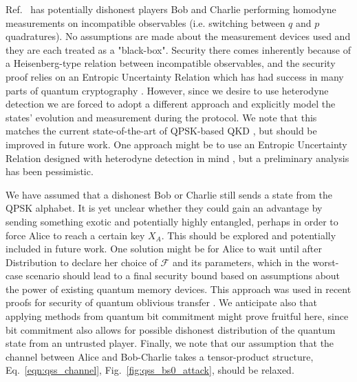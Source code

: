 Ref.~\cite{Kogias2017} has potentially dishonest players Bob and Charlie performing homodyne measurements on incompatible observables (i.e. switching between $q$ and $p$ quadratures). No assumptions are made about the measurement devices used and they are each treated as a "black-box". Security there comes inherently because of a Heisenberg-type relation between incompatible observables, and the security proof relies on an Entropic Uncertainty Relation which has had success in many parts of quantum cryptography \cite{Furrer2012, Furrer2017}. However, since we desire to use heterodyne detection we are forced to adopt a different approach and explicitly model the states' evolution and measurement during the protocol. We note that this matches the current state-of-the-art of QPSK-based QKD \cite{Papanastasiou2018}, but should be improved in future work. One approach might be to use an Entropic Uncertainty Relation designed with heterodyne detection in mind \cite{DePalma2017i, DePalma2017}, but a preliminary analysis has been pessimistic.

We have assumed that a dishonest Bob or Charlie still sends a state from the QPSK alphabet. It is yet unclear whether they could gain an advantage by sending something exotic and potentially highly entangled, perhaps in order to force Alice to reach a certain key $X_A$. This should be explored and potentially included in future work. One solution might be for Alice to wait until after Distribution to declare her choice of $\mathcal{F}$ and its parameters, which in the worst-case scenario should lead to a final security bound based on assumptions about the power of existing quantum memory devices. This approach was used in recent proofs for security of quantum oblivious transfer \cite{Furrer2017, Broadbent2015}. We anticipate also that applying methods from quantum bit commitment \cite{Broadbent2015} might prove fruitful here, since bit commitment also allows for possible dishonest distribution of the quantum state from an untrusted player. Finally, we note that our assumption that the channel between Alice and Bob-Charlie takes a tensor-product structure, Eq.~\ref{eqn:qss_channel}, Fig.~\ref{fig:qss_bs0_attack}, should be relaxed. %





